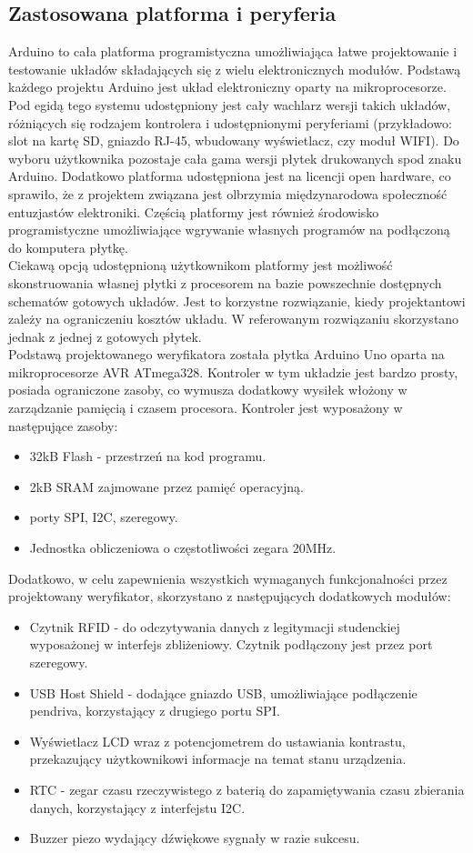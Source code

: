 \documentclass[declaration,shortabstract, mgr]{iithesis}
\begin{document}
\subsection{Zastosowana platforma i peryferia}
\indent Arduino to cała platforma programistyczna umożliwiająca łatwe projektowanie i testowanie układów składających się z wielu elektronicznych modułów. Podstawą każdego projektu Arduino jest układ elektroniczny oparty na mikroprocesorze. Pod egidą tego systemu udostępniony jest cały wachlarz wersji takich układów, różniących się rodzajem kontrolera i udostępnionymi peryferiami (przykładowo: slot na kartę SD, gniazdo RJ-45, wbudowany wyświetlacz, czy moduł WIFI). Do wyboru użytkownika pozostaje cała gama wersji płytek drukowanych spod znaku Arduino. Dodatkowo platforma udostępniona jest na licencji open hardware, co sprawiło, że z projektem związana jest olbrzymia międzynarodowa społeczność entuzjastów elektroniki. Częścią platformy jest również środowisko programistyczne umożliwiające wgrywanie własnych programów na podłączoną do komputera płytkę.\\
\indent Ciekawą opcją udostępnioną użytkownikom platformy jest możliwość skonstruowania własnej płytki z procesorem na bazie powszechnie dostępnych schematów gotowych układów. Jest to korzystne rozwiązanie, kiedy projektantowi zależy na ograniczeniu kosztów układu. W referowanym rozwiązaniu skorzystano jednak z jednej z gotowych płytek.\\
\indent Podstawą projektowanego weryfikatora została płytka Arduino Uno oparta na mikroprocesorze AVR ATmega328. Kontroler w tym układzie jest bardzo prosty, posiada ograniczone zasoby, co wymusza dodatkowy wysiłek włożony w zarządzanie pamięcią i czasem procesora. Kontroler jest wyposażony w następujące zasoby:
\begin{itemize}
\item 32kB Flash - przestrzeń na kod programu.
\item 2kB SRAM zajmowane przez pamięć operacyjną.
\item porty SPI, I2C, szeregowy.
\item Jednostka obliczeniowa o częstotliwości zegara 20MHz.
\end{itemize}
\indent Dodatkowo, w celu zapewnienia wszystkich wymaganych funkcjonalności przez projektowany weryfikator, skorzystano z następujących dodatkowych modułów:
\begin{itemize}
\item Czytnik RFID - do odczytywania danych z legitymacji studenckiej wyposażonej w interfejs zbliżeniowy. Czytnik podłączony jest przez port szeregowy.
\item USB Host Shield - dodające gniazdo USB, umożliwiające podłączenie pendriva, korzystający z drugiego portu SPI.
\item Wyświetlacz LCD wraz z potencjometrem do ustawiania kontrastu, przekazujący użytkownikowi informacje na temat stanu urządzenia.
\item RTC - zegar czasu rzeczywistego z baterią do zapamiętywania czasu zbierania danych, korzystający z interfejstu I2C.
\item Buzzer piezo wydający dźwiękowe sygnały w razie sukcesu.
\end{itemize}
\end{document}
